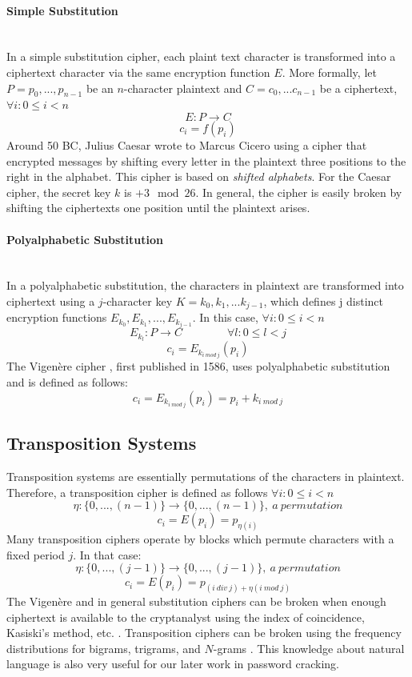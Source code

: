 \paragraph{Simple Substitution} \mbox{} \\ 
In a simple substitution cipher, each plaint text character is transformed into a ciphertext character via the same encryption function $E$. More formally, let $P = p_{0}, ... ,p_{n-1}$ be an $n$-character plaintext and $C=c_{0},...c_{n-1}$ be a ciphertext,  $\forall i : 0 \leq i < n $ 
$$ E : P \rightarrow C$$
$$c_{i} = f (p_{i})$$
Around 50 BC, Julius Caesar wrote to Marcus Cicero using a cipher that encrypted messages by shifting every letter in the plaintext three positions to the right in the alphabet. This cipher is based on \textit{shifted alphabets}. For the Caesar cipher, the secret key $k$ is $+3\mod{26}$. In general, the cipher is easily broken by shifting the ciphertexts one position until the plaintext arises.
\paragraph{Polyalphabetic Substitution} \mbox{} \\ 
In a polyalphabetic substitution, the characters in plaintext are transformed into ciphertext using a $j$-character key $K = k_{0}, k_{1}, ... k_{j-1}$, which defines j distinct encryption functions $E_{k_{0}}, E_{k_{1}}, ... , E_{k_{j-1}}$. In this case, $\forall i : 0 \leq i < n$  $$ E_{k_{l}} : P \rightarrow C   \qquad  \qquad   \forall l : 0 \leq l < j$$
$$ c_{i} = E_{k_{i\ mod\ j}}(p_{i})$$
The Vigen\`{e}re cipher \cite{robling1982cryptography}, first published in 1586, uses polyalphabetic substitution and is defined as follows:$$ c_{i} = E_{k_{i\ mod \ j}}(p_{i}) = p_{i} + k_{i\ mod \ j} $$
\subsection{Transposition Systems}
Transposition systems are essentially permutations of the characters in plaintext. Therefore, a transposition cipher is defined as follows $\forall i : 0 \leq i < n$ 
$$ \eta : \{0,...,(n-1)\} \rightarrow \{0,...,(n-1)\},\ a\ permutation$$
$$c_{i} = E(p_{i}) = p_{\eta (i)}$$
Many transposition ciphers operate by blocks which permute characters with a fixed period $j$. In that case:
$$ \eta : \{0,...,(j-1)\} \rightarrow \{0,...,(j-1)\},\ a\ permutation$$
$$c_{i} = E(p_{i}) = p_{(i\ div\ j)+\eta (i\ mod\ j)}$$
The Vigen\`{e}re and in general substitution ciphers can be broken when enough ciphertext is available to the cryptanalyst using the index of coincidence, Kasiski's method, etc. \cite{davies1989security,robling1982cryptography,kahn1996codebreakers}. Transposition ciphers can be broken using the frequency distributions for bigrams, trigrams, and $N$-grams \cite{davies1989security, robling1982cryptography, kahn1996codebreakers}. This knowledge about natural language is also very useful for our later work in password cracking.
